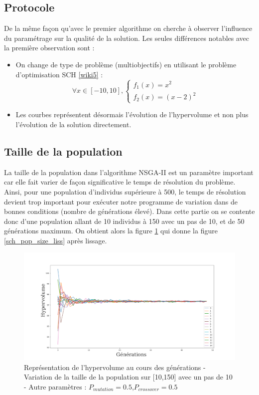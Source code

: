 \documentclass[12pt]{report}
\begin{document}
      \subsection{Protocole}

      De la même façon qu'avec le premier algorithme on cherche à observer l'influence du paramétrage sur la qualité de la solution. Les seules différences notables avec la première observation sont :
      \begin{itemize}
        \item On change de type de problème (multiobjectifs) en utilisant le problème d'optimisation SCH \ref{wiki5}  :
        $$
        \forall x \in [-10,10],
        \left\{
          \begin{array}{ll}
             f_1(x) = x^2 \\
             f_2(x) = (x-2)^2
          \end{array}
        \right.
        $$
        \item Les courbes représentent désormais l'évolution de l'hypervolume et non plus l'évolution de la solution directement.
      \end{itemize}


      \subsection{Taille de la population}
      La taille de la population dans l'algorithme NSGA-II est un paramètre important car elle fait varier de façon significative le temps de résolution du problème. Ainsi, pour une population d'individus supérieure à 500, le temps de résolution devient trop important pour exécuter notre programme de variation dans de bonnes conditions (nombre de générations élevé). Dans cette partie on se contente donc d'une population allant de 10 individus à 150 avec un pas de 10, et de 50 générations maximum. On obtient alors la figure \ref{sch_pop_size_moy} qui donne la figure \ref{sch_pop_size_liss} après lissage. \\

      \begin{figure}[h]
        \centering
        \includegraphics[width=18cm]{img/pop_size_sch_moy.png}
        \caption{Représentation de l'hypervolume au cours des générations - Variation de la taille de la population sur [10,150] avec un pas de 10 - Autre paramètres : $P_{mutation} = 0.5$,$P_{crossover} = 0.5$}
        \label{sch_pop_size_moy}
      \end{figure}
\end{document}
